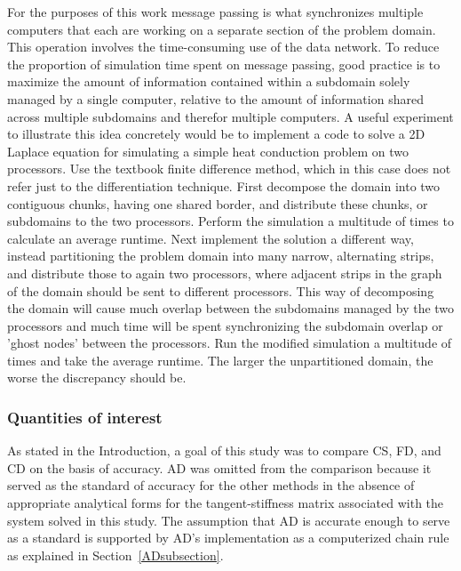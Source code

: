 \documentclass[preprint,12pt]{elsarticle}
\begin{document}
For the purposes of this work message passing is what
synchronizes multiple computers that each are working on a separate section
of the problem domain. This operation involves the time-consuming use of
the data network. To reduce the proportion of simulation time spent on
message passing, good practice is to maximize the amount of information
contained within a subdomain solely managed by a single computer, relative
to the amount of information shared across multiple subdomains and
therefor multiple computers. A useful experiment to illustrate this idea
concretely would be to implement a code to solve a 2D Laplace equation for
simulating a simple heat conduction problem on two processors. Use the
textbook finite difference method, which in this case does not refer just
to the differentiation technique.  First decompose the domain into two
contiguous chunks, having one shared border, and distribute these chunks,
or subdomains to the two processors. Perform the simulation a multitude of
times to calculate an average runtime.  Next implement the solution a
different way, instead partitioning the problem domain into many narrow,
alternating strips, and distribute those to again two processors, where adjacent
strips in the graph of the domain should be sent to different processors. This way
of decomposing the domain will cause much overlap between the subdomains
managed by the two processors and much time will be spent synchronizing the
subdomain overlap or 'ghost nodes' between the processors. Run the modified
simulation a multitude of times and take the average runtime. The larger
the unpartitioned domain, the worse the discrepancy should be.

\subsubsection{Quantities of interest} \label{JGAM} 

As stated in the Introduction, a goal of this study was to compare CS, FD, and
CD on the basis of accuracy. AD was omitted from the comparison because it
served as the standard of accuracy for the other methods in the absence of
appropriate analytical forms for the tangent-stiffness matrix associated with
the system solved in this study. The assumption that AD is accurate enough to
serve as a standard is supported by AD's implementation as a computerized chain
rule as explained in Section~\ref{ADsubsection}.
\end{document}
